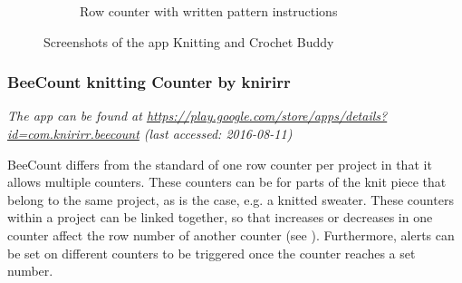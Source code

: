 \begin{figure}[H]
\begin{subfigure}[b]{0.33\textwidth}
        \caption[Row counter with written pattern instructions ]{Row counter with written pattern instructions}
    \end{subfigure}
  \caption[Screenshots of the app Knitting and Crochet Buddy ]{Screenshots of the app Knitting and Crochet Buddy}
\end{figure}

\subsubsection*{BeeCount knitting Counter by knirirr}

\textit{ The app can be found at \url{https://play.google.com/store/apps/details?id=com.knirirr.beecount} \small{(last accessed: 2016-08-11)}}
\vspace*{0.5cm}

\noindent BeeCount differs from the standard of one row counter per project in that it allows multiple counters. These counters can be for parts of the knit piece that  belong to the same project, as is the case, e.g. a knitted sweater. These counters within a project can be linked together, so that increases or decreases in one counter affect the row number of another counter (see ). Furthermore, alerts can be set on different counters to be triggered once the counter
reaches a set number.

